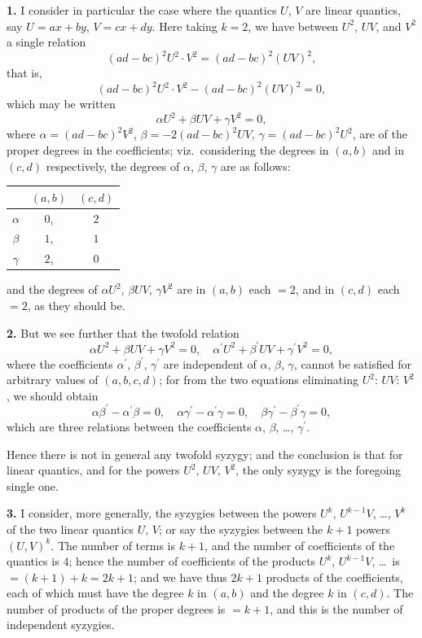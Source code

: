 \documentclass[12pt,a4paper]{article}
\begin{document}
\textbf{1.} I consider in particular the case where the quantics $U$, $V$ are linear quantics,
say $U = ax + by$, $V = cx + dy$. Here taking $k = 2$, we have between $U^2$, $UV$,
and $V^2$ a single relation
\[
(ad - bc)^2 U^2 \cdot V^2 = (ad - bc)^2 (UV)^2,
\]
that is,
\[
(ad - bc)^2 U^2 \cdot V^2 - (ad - bc)^2 (UV)^2 = 0,
\]
which may be written
\[
\alpha U^2 + \beta UV + \gamma V^2 = 0,
\]
where $\alpha = (ad - bc)^2 V^2$, $\beta = -2(ad - bc)^2 UV$, $\gamma = (ad - bc)^2 U^2$, are of the
proper degrees in the coefficients; viz.~considering the degrees in $(a, b)$ and in
$(c, d)$ respectively, the degrees of $\alpha$, $\beta$, $\gamma$ are as follows:
\begin{center}
\begin{tabular}{c|cc}
& $(a, b)$ & $(c, d)$ \\
\hline
$\alpha$ & $0$, & $2$ \\
$\beta$ & $1$, & $1$ \\
$\gamma$ & $2$, & $0$
\end{tabular}
\end{center}
and the degrees of $\alpha U^2$, $\beta UV$, $\gamma V^2$ are in $(a, b)$ each $= 2$, and in $(c, d)$
each $= 2$, as they should be.

\newpage
\textbf{2.} But we see further that the twofold relation
\[
\alpha U^2 + \beta UV + \gamma V^2 = 0, \quad \alpha^\prime U^2 + \beta^\prime UV + \gamma^\prime V^2 = 0,
\]
where the coefficients $\alpha^\prime$, $\beta^\prime$, $\gamma^\prime$ are independent of $\alpha$, $\beta$, $\gamma$, cannot be satisfied
for arbitrary values of $(a, b, c, d)$; for from the two equations eliminating $U^2$:
$UV$:
$V^2$, we should obtain
\[
\alpha\beta^\prime - \alpha^\prime\beta = 0, \quad \alpha\gamma^\prime - \alpha^\prime\gamma = 0, \quad \beta\gamma^\prime - \beta^\prime\gamma = 0,
\]
which are three relations between the coefficients $\alpha$, $\beta$, \ldots, $\gamma^\prime$.

Hence there is not in general any twofold syzygy; and the conclusion is that
for linear quantics, and for the powers $U^2$, $UV$, $V^2$, the only syzygy is the foregoing
single one.

\textbf{3.} I consider, more generally, the syzygies between the powers $U^k$,
$U^{k-1}V$, \ldots, $V^k$ of the two linear quantics $U$, $V$; or say the syzygies between the
$k + 1$ powers $(U, V)^k$. The number of terms is $k + 1$, and the number of
coefficients of the quantics is $4$; hence the number of coefficients of the products
$U^k$, $U^{k-1}V$, \ldots\ is $= (k + 1) + k = 2k + 1$; and we have thus $2k + 1$ products of
the coefficients, each of which must have the degree $k$ in $(a, b)$ and the degree $k$
in $(c, d)$. The number of products of the proper degrees is $= k + 1$, and this is the
number of independent syzygies.
\end{document}
